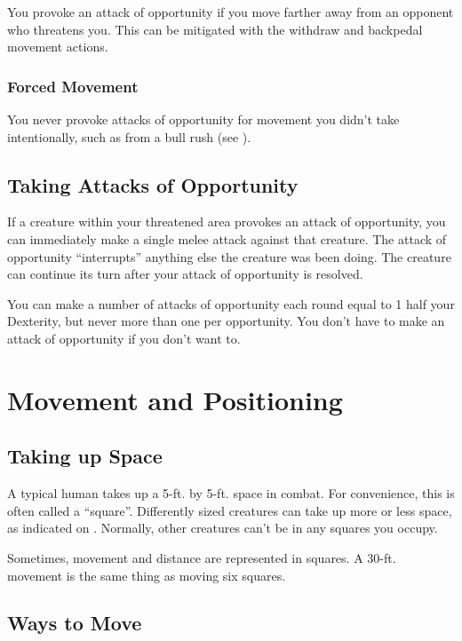 You provoke an attack of opportunity if you move farther away from an opponent who threatens you. This can be mitigated with the withdraw and backpedal movement actions.

\subsubsection{Forced Movement} You never provoke attacks of opportunity for movement you didn't take intentionally, such as from a bull rush (see ).

\subsection{Taking Attacks of Opportunity}
If a creature within your threatened area provokes an attack of opportunity, you can immediately make a single melee attack against that creature. The attack of opportunity ``interrupts'' anything else the creature was been doing. The creature can continue its turn after your attack of opportunity is resolved.

You can make a number of attacks of opportunity each round equal to 1 \add half your Dexterity, but never more than one per opportunity. You don't have to make an attack of opportunity if you don't want to.

\section{Movement and Positioning}

\subsection{Taking up Space}
A typical human takes up a 5-ft. by 5-ft. space in combat. For convenience, this is often called a ``square''. Differently sized creatures can take up more or less space, as indicated on . Normally, other creatures can't be in any squares you occupy.

Sometimes, movement and distance are represented in squares. A 30-ft. movement is the same thing as moving six squares.

\subsection{Ways to Move}

